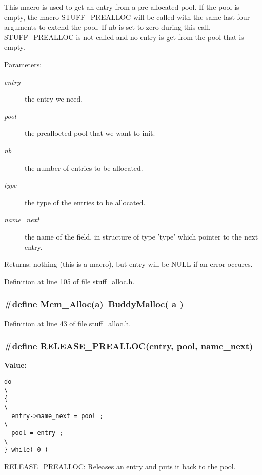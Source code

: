 This macro is used to get an entry from a pre-allocated pool. If the pool is empty, the macro STUFF\_\-PREALLOC will be called with the same last four arguments to extend the pool. If nb is set to zero during this call, STUFF\_\-PREALLOC is not called and no entry is get from the pool that is empty.

\begin{Desc}
\item[Parameters:]
\begin{description}
\item[{\em entry}]the entry we need. \item[{\em pool}]the preallocted pool that we want to init. \item[{\em nb}]the number of entries to be allocated. \item[{\em type}]the type of the entries to be allocated. \item[{\em name\_\-next}]the name of the field, in structure of type 'type' which pointer to the next entry.\end{description}
\end{Desc}
\begin{Desc}
\item[Returns:]nothing (this is a macro), but entry will be NULL if an error occures. \end{Desc}


Definition at line 105 of file stuff\_\-alloc.h.
\subsubsection{\setlength{\rightskip}{0pt plus 5cm}\#define Mem\_\-Alloc(a)\ Buddy\-Malloc( a )}\label{stuff__alloc_8h_a0}




Definition at line 43 of file stuff\_\-alloc.h.
\subsubsection{\setlength{\rightskip}{0pt plus 5cm}\#define RELEASE\_\-PREALLOC(entry, pool, name\_\-next)}\label{stuff__alloc_8h_a3}


{\bf Value:}

\footnotesize\begin{verbatim}do                                                                        \
{                                                                         \
  entry->name_next = pool ;                                               \
  pool = entry ;                                                          \
} while( 0 )
\end{verbatim}\normalsize 
RELEASE\_\-PREALLOC: Releases an entry and puts it back to the pool.

